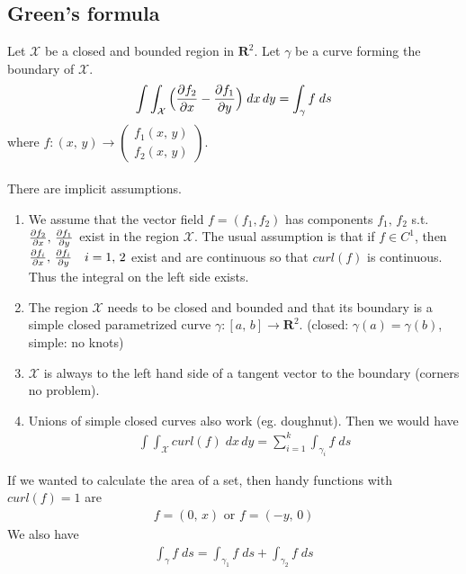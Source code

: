 \documentclass[8pt]{extarticle}
\newcommand{\R}{{\mathbb R}}
\newcommand{\X}{{\mathcal X}}
\newcommand{\ra}{{\rightarrow}}
\def\R{\mathbf{R}}
\begin{document}
\begin{multicols*}{3}
  \subsection{Green's formula}
  Let $\X$ be a closed and bounded region in $\R^2$.
  Let $\gamma$ be a curve forming the boundary of $\X$.
  \begin{align*}
    \int \int_\X \Big( \pdv{f_2}{x} - \pdv{f_1}{y} \Big) \; dx \, dy
    = \int_\gamma f \; ds
  \end{align*}
  where $f: (x, \, y) \ra \begin{pmatrix}
      f_1(x, \, y) \\
      f_2(x, \, y)
    \end{pmatrix}$.\\ \\
  There are implicit assumptions.
  \begin{enumerate}[label=(\arabic*)]
    \item We assume that the vector field $f= (f_1, f_2)$ has components
          $f_1, \, f_2$ s.t. $\pdv{f_2}{x}, \, \pdv{f_1}{y}$ exist
          in the region $\X$. The usual assumption is that if $f \in C^1$,
          then $\pdv{f_i}{x}, \, \pdv{f_i}{y} \quad i = 1, \, 2$ exist and are continuous
          so that $curl(f)$ is continuous. Thus the integral on the left side exists.
    \item The region $\X$ needs to be closed and bounded and that its boundary
          is a simple closed parametrized curve $\gamma: [a, \, b] \ra \R^2$.
          (closed: $\gamma(a) = \gamma(b)$, simple: no knots)
    \item $\X$ is always to the left hand side of a tangent vector to the boundary
          (corners no problem).
    \item Unions of simple closed curves also work (eg. doughnut).
          Then we would have
          \begin{align*}
            \int \int_\X curl(f) \; dx \, dy = \sum_{i = 1}^k \int_{\gamma_i} f \; ds
          \end{align*}
  \end{enumerate}
  If we wanted to calculate the area of a set, then handy
  functions with $curl(f) = 1 $ are
  \begin{align*}
    f=(0, \, x) \text{ or } f = (-y, \, 0)
  \end{align*}
  We also have
  \begin{align*}
    \int_\gamma f \; ds = \int_{\gamma_1} f \; ds +\int_{\gamma_2} f \; ds
  \end{align*}

\end{multicols*}
\end{document}
